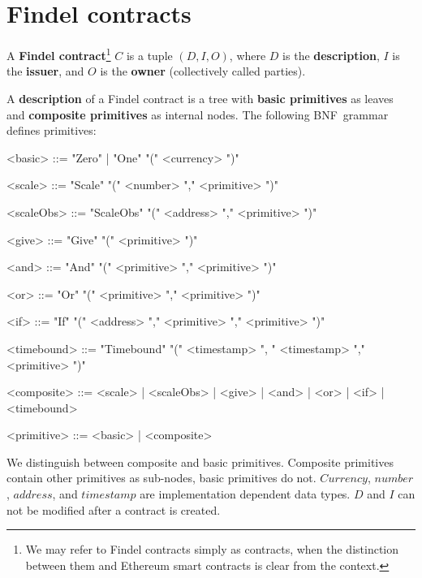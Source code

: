 
\section{Findel contracts} \label{sec:Ch10FindelSyntax}

\begin{definition} \label{def:Ch10FindelFindelContract}
	A \textbf{Findel contract}\footnote{We may refer to Findel contracts simply as contracts, when the distinction between them and Ethereum smart contracts is clear from the context.} $C$ is a tuple $(D,I,O)$, where $D$ is the \textbf{description}, $I$ is the \textbf{issuer}, and $O$ is the \textbf{owner} (collectively called parties). 
\end{definition}

\begin{definition} \label{def:Ch10FindelDescription}
	A \textbf{description} of a Findel contract is a tree with \textbf{basic primitives} as leaves and \textbf{composite primitives} as internal nodes. The following BNF~grammar defines primitives:
	\begin{grammar}
		
		<basic> ::= "Zero" | "One" "(" <currency> ")"
		
		<scale> ::= "Scale" "(" <number> "," <primitive> ")"
		
		<scaleObs> ::= "ScaleObs" "(" <address> "," <primitive> ")"
		
		<give> ::= "Give" "(" <primitive> ")"
		
		<and> ::= "And" "(" <primitive> "," <primitive> ")"
		
		<or> ::= "Or" "(" <primitive> "," <primitive> ")"
		
		<if> ::= "If" "(" <address> "," <primitive> "," <primitive> ")"
		
		<timebound> ::= "Timebound" "(" <timestamp> ", " <timestamp> "," <primitive> ")"
		
		<composite> ::= <scale> | <scaleObs> | <give> | <and> | <or> | <if> | <timebound>
		
		<primitive> ::= <basic> | <composite>
		
	\end{grammar}
\end{definition}

We distinguish between composite and basic primitives.
Composite primitives contain other primitives as sub-nodes, basic primitives do not.
\(Currency\), \(number\), \(address\), and \(timestamp\) are implementation dependent data types.
$D$ and $I$ can not be modified after a contract is created.

